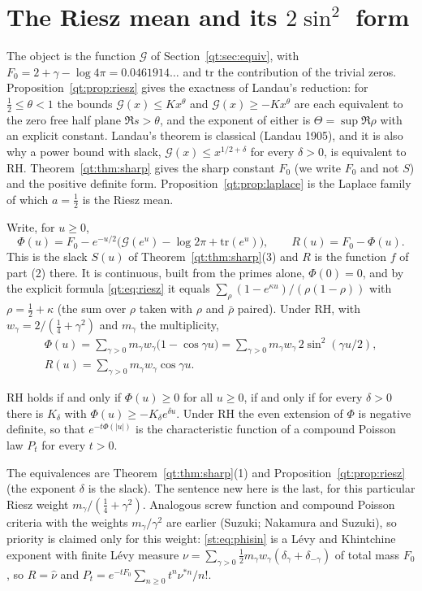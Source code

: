 \section{The Riesz mean and its \texorpdfstring{$2\sin^2$}{2 sin2} form}\label{st:sec:riesz}
The object is the function $\mathcal G$ of Section~\ref{qt:sec:equiv}, with $F_0=2+\gamma-\log4\pi=0.0461914\ldots$ and $\mathrm{tr}$ the contribution of the trivial zeros. Proposition~\ref{qt:prop:riesz} gives the exactness of Landau's reduction: for $\tfrac12\le\theta<1$ the bounds $\mathcal G(x)\le Kx^\theta$ and $\mathcal G(x)\ge-Kx^\theta$ are each equivalent to the zero free half plane $\Re s>\theta$, and the exponent of either is $\Theta=\sup\Re\rho$ with an explicit constant. Landau's theorem is classical (Landau 1905), and it is also why a power bound with slack, $\mathcal G(x)\le x^{1/2+\delta}$ for every $\delta>0$, is equivalent to RH. Theorem~\ref{qt:thm:sharp} gives the sharp constant $F_0$ (we write $F_0$ and not $S$) and the positive definite form. Proposition~\ref{qt:prop:laplace} is the Laplace family of which $a=\tfrac12$ is the Riesz mean.

Write, for $u\ge0$,
\[
\Phi(u)=F_0-e^{-u/2}\big(\mathcal G(e^u)-\log2\pi+\mathrm{tr}(e^u)\big),\qquad R(u)=F_0-\Phi(u).
\]
This is the slack $S(u)$ of Theorem~\ref{qt:thm:sharp}(3) and $R$ is the function $f$ of part (2) there. It is continuous, built from the primes alone, $\Phi(0)=0$, and by the explicit formula \eqref{qt:eq:riesz} it equals $\sum_\rho(1-e^{\kappa u})/(\rho(1-\rho))$ with $\rho=\tfrac12+\kappa$ (the sum over $\rho$ taken with $\rho$ and $\bar\rho$ paired). Under RH, with $w_\gamma=2/(\tfrac14+\gamma^2)$ and $m_\gamma$ the multiplicity,
\begin{equation}\label{st:eq:phisin}
\begin{gathered}
\Phi(u)=\sum_{\gamma>0}m_\gamma w_\gamma\big(1-\cos\gamma u\big)=\sum_{\gamma>0}m_\gamma w_\gamma\,2\sin^2(\gamma u/2),\\ R(u)=\sum_{\gamma>0}m_\gamma w_\gamma\cos\gamma u .
\end{gathered}
\end{equation}
\begin{theorem}\label{st:thm:phi}
RH holds if and only if $\Phi(u)\ge0$ for all $u\ge0$, if and only if for every $\delta>0$ there is $K_\delta$ with $\Phi(u)\ge-K_\delta e^{\delta u}$. Under RH the even extension of $\Phi$ is negative definite, so that $e^{-t\Phi(|u|)}$ is the characteristic function of a compound Poisson law $P_t$ for every $t>0$.
\end{theorem}
The equivalences are Theorem~\ref{qt:thm:sharp}(1) and Proposition~\ref{qt:prop:riesz} (the exponent $\delta$ is the slack). The sentence new here is the last, for this particular Riesz weight $m_\gamma/(\tfrac14+\gamma^2)$. Analogous screw function and compound Poisson criteria with the weights $m_\gamma/\gamma^2$ are earlier (Suzuki; Nakamura and Suzuki), so priority is claimed only for this weight: \eqref{st:eq:phisin} is a L\'evy and Khintchine exponent with finite L\'evy measure $\nu=\sum_{\gamma>0}\tfrac12m_\gamma w_\gamma(\delta_\gamma+\delta_{-\gamma})$ of total mass $F_0$, so $R=\hat\nu$ and $P_t=e^{-tF_0}\sum_{n\ge0}t^n\nu^{*n}/n!$.

